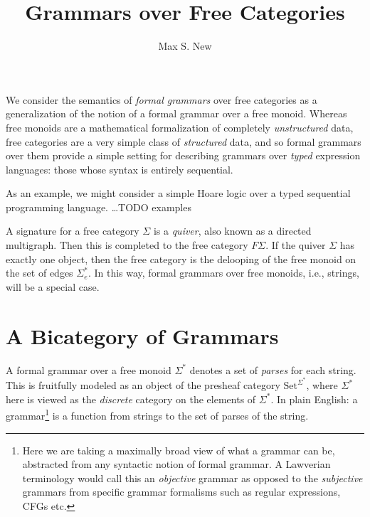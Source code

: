 \documentclass[12pt]{article}
\newcommand{\Set}{\textrm{Set}}
\begin{document}
\title{Grammars over Free Categories}
\author{Max S. New}
\maketitle

We consider the semantics of \emph{formal grammars} over free
categories as a generalization of the notion of a formal grammar over
a free monoid. Whereas free monoids are a mathematical formalization
of completely \emph{unstructured} data, free categories are a very
simple class of \emph{structured} data, and so formal grammars over
them provide a simple setting for describing grammars over
\emph{typed} expression languages: those whose syntax is entirely
sequential.

As an example, we might consider a simple Hoare logic over a typed
sequential programming language. \ldots TODO examples

A signature for a free category $\Sigma$ is a \emph{quiver}, also
known as a directed multigraph. Then this is completed to the free
category $F\Sigma$. If the quiver $\Sigma$ has exactly one object,
then the free category is the delooping of the free monoid on the set
of edges $\Sigma_e^*$. In this way, formal grammars over free monoids,
i.e., strings, will be a special case.

\section{A Bicategory of Grammars}

A formal grammar over a free monoid $\Sigma^*$ denotes a set of
\emph{parses} for each string. This is fruitfully modeled as an object
of the presheaf category $\Set^{\Sigma^*}$, where $\Sigma^*$ here is
viewed as the \emph{discrete} category on the elements of
$\Sigma^*$. In plain English: a grammar\footnote{Here we are taking a
maximally broad view of what a grammar can be, abstracted from any
syntactic notion of formal grammar. A Lawverian terminology would call
this an \emph{objective} grammar as opposed to the \emph{subjective}
grammars from specific grammar formalisms such as regular expressions,
CFGs etc.} is a function from strings to the set of parses of the
string.
\end{document}
